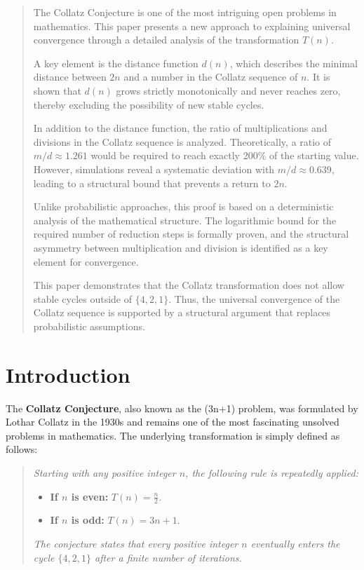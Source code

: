 \documentclass[a4paper,12pt]{article}
\begin{document}
\begin{abstract}
    The Collatz Conjecture is one of the most intriguing open problems in mathematics. This paper presents a new approach to explaining universal convergence through a detailed analysis of the transformation $T(n)$. 

    A key element is the distance function $d(n)$, which describes the minimal distance between $2n$ and a number in the Collatz sequence of $n$. It is shown that $d(n)$ grows strictly monotonically and never reaches zero, thereby excluding the possibility of new stable cycles.

    In addition to the distance function, the ratio of multiplications and divisions in the Collatz sequence is analyzed. Theoretically, a ratio of $m/d \approx 1.261$ would be required to reach exactly 200\% of the starting value. However, simulations reveal a systematic deviation with $m/d \approx 0.639$, leading to a structural bound that prevents a return to $2n$.

    Unlike probabilistic approaches, this proof is based on a deterministic analysis of the mathematical structure. The logarithmic bound for the required number of reduction steps is formally proven, and the structural asymmetry between multiplication and division is identified as a key element for convergence.

    This paper demonstrates that the Collatz transformation does not allow stable cycles outside of $\{4, 2, 1\}$. Thus, the universal convergence of the Collatz sequence is supported by a structural argument that replaces probabilistic assumptions.
\end{abstract}




\newpage
\tableofcontents

\clearpage

\section{Introduction}
The \textbf{Collatz Conjecture}, also known as the (3n+1) problem, was formulated by Lothar Collatz in the 1930s and remains one of the most fascinating unsolved problems in mathematics. The underlying transformation is simply defined as follows:

\begin{quote}
\textit{Starting with any positive integer \( n \), the following rule is repeatedly applied:}
\begin{itemize}
    \item \textbf{If \( n \) is even:} \( T(n) = \frac{n}{2} \).
    \item \textbf{If \( n \) is odd:} \( T(n) = 3n + 1 \).
\end{itemize}
\textit{The conjecture states that every positive integer \( n \) eventually enters the cycle \( \{4, 2, 1\} \) after a finite number of iterations.}
\end{quote}
\end{document}
